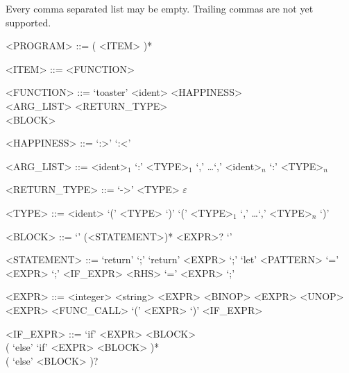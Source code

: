 \documentclass[10pt]{article}
\newcommand{\eempty}{$\varepsilon$}
\begin{document}
Every comma separated list may be empty. Trailing commas are not yet supported.

\begin{grammar}


    <PROGRAM> ::= ( <ITEM> )*

    <ITEM> ::= <FUNCTION>

    <FUNCTION> ::= `toaster' <ident> <HAPPINESS> \\
    <ARG_LIST> <RETURN_TYPE> \\
    <BLOCK>

    <HAPPINESS> ::= `:>' \alt `:<'


    <ARG_LIST> ::= <ident>$_1$ `:' <TYPE>$_1$ `,' \dots `,' <ident>$_n$ `:' <TYPE>$_n$

    <RETURN_TYPE> ::= `->' <TYPE>
    \alt \eempty

    <TYPE> ::= <ident>
    \alt `(' <TYPE> `)'
    \alt `(' <TYPE>$_1$ `,' \dots `,' <TYPE>$_n$ `)'


    <BLOCK> ::= `{' (<STATEMENT>)* <EXPR>? `}'

    <STATEMENT> ::= `return' `;'
    \alt `return' <EXPR> `;'
    \alt `let' <PATTERN> `=' <EXPR> `;'
    \alt <IF_EXPR>
    \alt <RHS> `=' <EXPR> `;'

    <EXPR> ::= <integer>
    \alt <string>
    \alt <EXPR> <BINOP> <EXPR>
    \alt <UNOP> <EXPR>
    \alt <FUNC_CALL>
    \alt `(' <EXPR> `)'
    \alt <IF_EXPR>

    <IF_EXPR> ::= `if' <EXPR> <BLOCK> \\ ( `else' `if' <EXPR> <BLOCK> )* \\( `else' <BLOCK> )?

\end{grammar}
\end{document}
